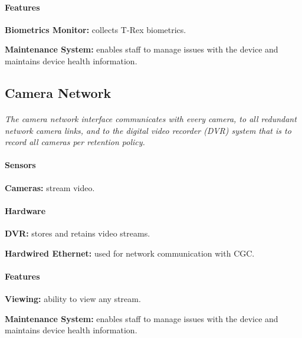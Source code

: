 \documentclass[12pt]{article}
\begin{document}
	\paragraph{Features}
	\begin{list}{}{}
		\item \textbf{Biometrics Monitor:} collects T-Rex biometrics.
		\item \textbf{Maintenance System:} enables staff to manage issues with the device	
		and maintains device health information.
	\end{list}

	\subsection{Camera Network}
	\paragraph{} \textit{The camera network interface communicates with every camera, to 
    all redundant network camera links, and to the digital video recorder (DVR) system 
    that is to record all cameras per retention policy.}		
	
	\paragraph{Sensors}
	\begin{list}{}{}
		\item \textbf{Cameras:} stream video.
	\end{list}
		
	\paragraph{Hardware}
	\begin{list}{}{}
		\item \textbf{DVR:} stores and retains video streams.
		\item \textbf{Hardwired Ethernet:} used for network communication with CGC. 
	\end{list}
	
	\paragraph{Features}
	\begin{list}{}{}
        \item \textbf{Viewing:} ability to view any stream.
        \item \textbf{Maintenance System:} enables staff to manage issues with the device	
		and maintains device health information.
	\end{list}
\end{document}
